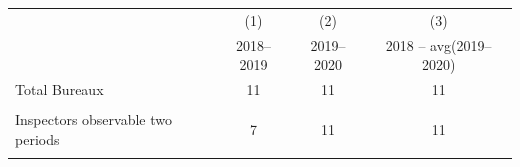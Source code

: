 {
\def\sym#1{\ifmmode^{#1}\else\(^{#1}\)\fi}
\begin{tabular}{l*{3}{c}}
\toprule
            &\multicolumn{1}{c}{(1)}&\multicolumn{1}{c}{(2)}&\multicolumn{1}{c}{(3)}\\
            &\multicolumn{1}{c}{2018–2019}&\multicolumn{1}{c}{2019–2020}&\multicolumn{1}{c}{2018 – avg(2019–2020)}\\
\midrule
Total Bureaux&          11         &          11         &          11         \\
            &                     &                     &                     \\
Inspectors observable two periods&           7         &          11         &          11         \\
            &                     &                     &                     \\
\bottomrule
\end{tabular}
}
